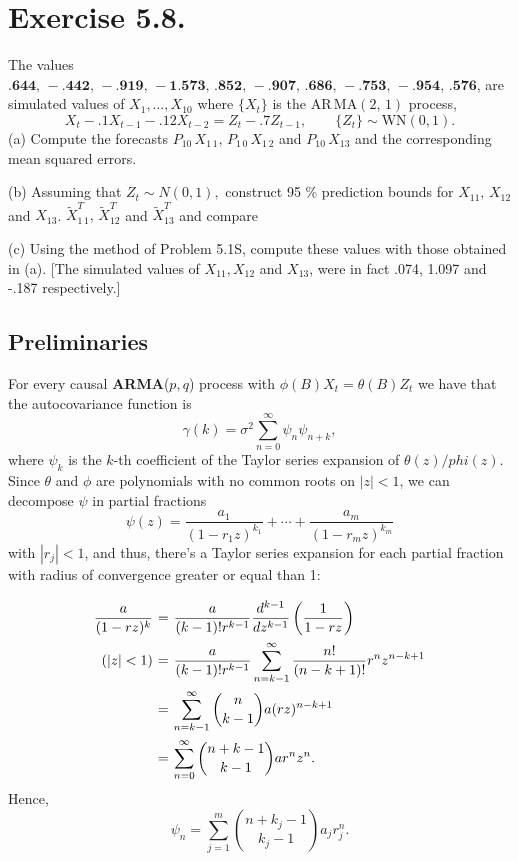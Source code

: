 \section*{Exercise 5.8.}

The values $\mathbf{. 6 4 4,} \,-\mathbf{. 4 4 2,} \,-\mathbf{. 9 1 9,} \,-\mathbf{1. 5 7 3,} \, \mathbf{. 8 5 2,} \,-\mathbf{. 9 0 7,} \, \mathbf{. 6 8 6,} \,-\mathbf{. 7 5 3,} \,-\mathbf{. 9 5 4,}\, \mathbf{. 5 7 6}$, are simulated values of $X_{1}, \ldots, X_{1 0}$ where $\{X_{t} \}$ is the $\mathrm{A R \, M A} ( 2, \, 1 )$ process,
\[ X_{t}-. 1 X_{t-1}-. 1 2 X_{t-2}=Z_{t}-. 7 Z_{t-1}, \hspace{2em} \{Z_{t} \} \sim \mathrm{W N} ( 0, 1 ). \]
(a) Compute the forecasts $P_{1 0} \, X_{1 \, 1}, \, P_{1 \, 0} \, X_{1 \, 2}$ and $P_{1 0} \, X_{1 3}$ and the corresponding mean squared errors.

(b) Assuming that $Z_{t} \sim N ( 0, 1 ),$ construct 95 \% prediction bounds for $X_{1 1}, \, X_{1 2}$ and $X_{1 3}$. $\tilde{X}_{1 \, 1}^{T}, \, \tilde{X}_{1 2}^{T}$ and $\tilde{X}_{1 3}^{T}$ and compare 

(c) Using the method of Problem 5.1S, compute
these values with those obtained in (a).
[The simulated values of $X_{1 1}, X_{1 2}$ and $X_{1 3}$, were in fact .074, 1.097 and -.187 respectively.]


\subsection*{Preliminaries}

For every causal \textbf{ARMA}($p,q$) process with $\phi(B) X_t = \theta(B)Z_t$ we have that the autocovariance function is
\[ \gamma(k) = \sigma^2 \sum_{n = 0}^{\infty} \psi_n \psi_{n+k}, \]
where $\psi_k$ is the $k$-th coefficient of the Taylor series expansion of $\theta(z)/phi(z)$. Since $\theta$ and $\phi$ are polynomials with no common roots on $|z| < 1$, we can decompose $\psi$ in partial fractions
\[ \psi(z) = \frac{a_1}{(1-r_1 z)^{k_1}} + \cdots + \frac{a_m}{(1-r_m z)^{k_m}} \]
with $|r_j| < 1$, and thus, there's a Taylor series expansion for each partial fraction with radius of convergence greater or equal than 1:
\[ \everymath{\displaystyle}
\arraycolsep=1.8pt\def\arraystretch{2.5}
\begin{array}{rcl}
    \frac{a}{(1-rz)^k} & = & \frac{a}{(k-1)! r^{k-1}} \frac{d^{k-1}}{dz^{k-1}} \left( \frac{1}{1-rz} \right)\\
    (|z| < 1) & = & \frac{a}{(k-1)! r^{k-1}} \sum_{n = k-1}^{\infty} \frac{n!}{(n-k+1)!} r^n z^{n-k+1}\\
    & = & \sum_{n = k-1}^{\infty} \binom{n}{k-1} a(rz)^{n-k+1}\\
    & = & \sum_{n = 0}^{\infty}  \binom{n+k-1}{k-1} a r^n z^n.
\end{array} \]
Hence,
\[ \psi_n = \sum_{j = 1}^m \binom{n+k_j-1}{k_j-1} a_j r_j^n. \]

